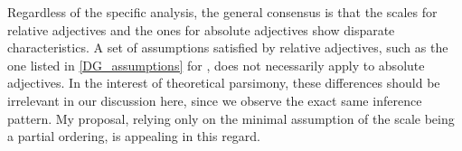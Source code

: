 \documentclass[12pt,letterpaper]{scrartcl}
\newcommand*\GnuplotDefs{
        set samples 51;
        Binv(p,q)=exp(lgamma(p+q)-lgamma(p)-lgamma(q));
        beta(x,p,q)=p<=0||q<=0?1/0:x<0||x>1?0.0:Binv(p,q)*x**(p-1.0)*(1.0-x)**(q-1.0);
    }
\begin{document}
\begin{comment}
\vspace{0.5cm}
\begin{tikzpicture}
    \begin{axis}[
      no markers, 
      domain=0:6, 
      samples=100,
      ymin=0,
      axis lines*=left, 
      xlabel={\scriptsize Height},
      ylabel={\scriptsize probability density},
      height=4cm, 
      width=7.5cm,
      xtick=\empty, 
      ytick=\empty,
      enlargelimits=false, 
      clip=false, 
      axis on top,
      grid = major,
      ]
        \addplot [very thick,cyan!50!black] {gauss(x, 3, 1)};
    \end{axis}
\end{tikzpicture}
\hskip 8pt

\begin{tikzpicture}
        \pgfmathsetmacro{\xmin}{0}
        \pgfmathsetmacro{\xmax}{1}
    \begin{axis}[
        xmin=\xmin,
        xmax=\xmax,
        no markers,
        ymin=0,
        axis lines*=left, 
        xlabel={\scriptsize Degree of danger},
        ylabel={\scriptsize probability density},
        height=4cm, 
        width=7.5cm,
        xtick=\empty, 
        ytick=\empty,
        enlargelimits=false, 
        clip=false, 
        axis on top,
        grid = major,
    ]
        \addplot [very thick,cyan!50!black] gnuplot [raw gnuplot] {
            \GnuplotDefs
            plot [x=\xmin:\xmax] beta(x,1,10);
        };
    \end{axis}
\end{tikzpicture}
\end{comment}
Regardless of the specific analysis, the general consensus is that the scales for relative adjectives and the ones for absolute adjectives show disparate characteristics. A set of assumptions satisfied by relative adjectives, such as the one listed in \ref{DG_assumptions} for \cite{daniels_even_2020}, does not necessarily apply to absolute adjectives. In the interest of theoretical parsimony, these differences should be irrelevant in our discussion here, since we observe the exact same inference pattern. My proposal, relying only on the minimal assumption of the scale being a partial ordering, is appealing in this regard.
\end{document}
